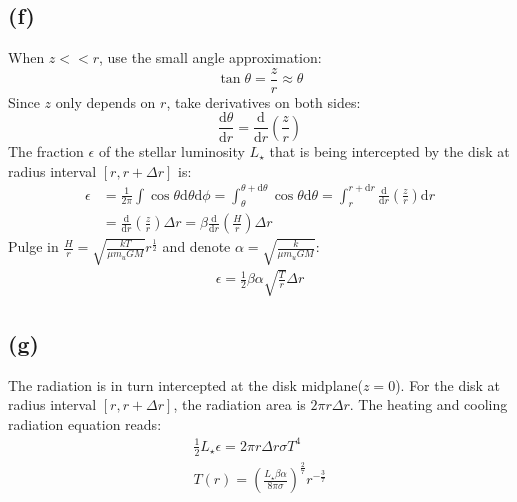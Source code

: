 \documentclass[a4paper,12pt]{article}
\begin{document}
\subsection*{(f)}
When $z<<r$, use the small angle approximation:
\begin{equation*}
    \tan \theta = \frac{z}{r} \approx \theta
\end{equation*}
Since $z$ only depends on $r$, take derivatives on both sides:
\begin{equation*}
    \frac{\text{d} \theta}{\text{d} r} = \frac{\text{d} }{\text{d} r} (\frac{z}{r})
\end{equation*}
The fraction $\epsilon$ of the stellar luminosity $L_\star$ that is being intercepted 
by the disk at radius interval $[r, r + \Delta r]$ is:
\begin{align*}
    \epsilon &= \frac{1}{2\pi} \int \cos \theta \text{d} \theta \text{d} \phi 
    = \int_{\theta}^{\theta + \text{d} \theta} \cos \theta \text{d} \theta 
    = \int_{r}^{r + \text{d} r} \frac{\text{d} }{\mathrm{d} r} (\frac{z}{r}) \text{d}r \\
    &= \frac{\text{d} }{\mathrm{d} r} (\frac{z}{r}) \Delta r
    = \beta \frac{\text{d} }{\mathrm{d} r} (\frac{H}{r}) \Delta r
\end{align*}
Pulge in $\frac{H}{r} = \sqrt{\frac{kT}{\mu m_u G M}} r^{\frac{1}{2}}$ and denote $\alpha = \sqrt{\frac{k}{\mu m_u G M}}$:
\begin{align*}
    \epsilon = \frac{1}{2} \beta \alpha \sqrt{\frac{T}{r}} \Delta r
\end{align*}


\subsection*{(g)}
The radiation is in turn intercepted at the disk midplane($z=0$). For the disk at radius interval $[r, r + \Delta r]$, 
the radiation area is $2\pi r \Delta r$. The heating and cooling radiation equation reads:
\begin{align*}
    \frac{1}{2} L_\star \epsilon = 2\pi r \Delta r \sigma T^4 \\
    T(r) = (\frac{L_\star  \beta \alpha}{8\pi \sigma} )^{\frac{2}{7}} r^{-\frac{3}{7}}
\end{align*}
\end{document}
